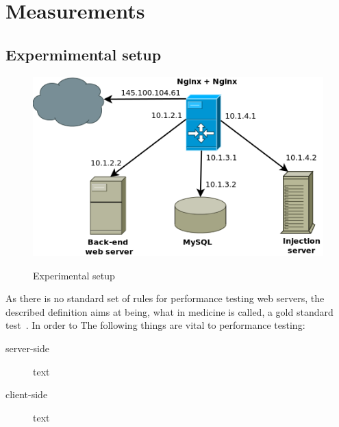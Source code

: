 \documentclass[Measurements]{subfiles}
\begin{document}
\section{Measurements}
\label{sec:Measurements}

\subsection{Expermimental setup}
\begin{figure}[h]
\caption{Experimental setup}
\centering
\includegraphics[scale=0.4] {images/infrastructure.png}
\label{fig:Experimental setup}
\end{figure}

As there is no standard set of rules for performance testing web servers, the described definition aims at being, what in medicine is called, a gold standard test~\cite{wacholder1993validation}.
In order to The following things are vital to performance testing:

\begin{description} 
 \item[server-side] text 
 \item[client-side] text
\end{description}
\end{document}
